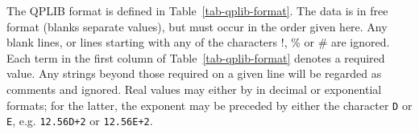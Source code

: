 
The QPLIB format is defined in Table~\ref{tab-qplib-format}.
The data is in free format (blanks separate values), but must occur in
the order given here. Any blank lines, or lines starting with any of the
characters !, \% or \# are ignored. Each term in the first column of
Table~\ref{tab-qplib-format} denotes a required value. Any strings beyond
those required on a given line will be regarded as comments and ignored.
Real values may either by in decimal or exponential formats; for the latter,
the exponent may be preceded by either the character {\tt D} or {\tt E},
e.g. {\tt 12.56D+2} or {\tt 12.56E+2}.

